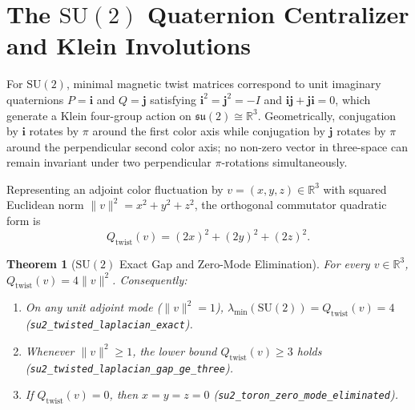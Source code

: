 \documentclass[11pt,a4paper]{article}
\newtheorem{theorem}{Theorem}[section]
\newcommand{\R}{\mathbb{R}}
\newcommand{\SU}{\mathrm{SU}}
\begin{document}
\section{The $\SU(2)$ Quaternion Centralizer and Klein Involutions}
For $\SU(2)$, minimal magnetic twist matrices correspond to unit imaginary quaternions $P = \mathbf{i}$ and $Q = \mathbf{j}$ satisfying $\mathbf{i}^2 = \mathbf{j}^2 = -I$ and $\mathbf{i}\mathbf{j} + \mathbf{j}\mathbf{i} = 0$, which generate a Klein four-group action on $\mathfrak{su}(2) \cong \R^3$. Geometrically, conjugation by $\mathbf{i}$ rotates by $\pi$ around the first color axis while conjugation by $\mathbf{j}$ rotates by $\pi$ around the perpendicular second color axis; no non-zero vector in three-space can remain invariant under two perpendicular $\pi$-rotations simultaneously.

Representing an adjoint color fluctuation by $v = (x, y, z) \in \R^3$ with squared Euclidean norm $\|v\|^2 = x^2 + y^2 + z^2$, the orthogonal commutator quadratic form is
\begin{equation}
Q_{\mathrm{twist}}(v) = (2x)^2 + (2y)^2 + (2z)^2.
\end{equation}

\begin{theorem}[$\SU(2)$ Exact Gap and Zero-Mode Elimination]
For every $v \in \R^3$, $Q_{\mathrm{twist}}(v) = 4 \|v\|^2$. Consequently:
\begin{enumerate}
\item On any unit adjoint mode ($\|v\|^2 = 1$), $\lambda_{\min}(\SU(2)) = Q_{\mathrm{twist}}(v) = 4$ (\texttt{su2\_\-twisted\_\-laplacian\_\-exact}).
\item Whenever $\|v\|^2 \ge 1$, the lower bound $Q_{\mathrm{twist}}(v) \ge 3$ holds (\texttt{su2\_\-twisted\_\-laplacian\_\-gap\_\-ge\_\-three}).
\item If $Q_{\mathrm{twist}}(v) = 0$, then $x = y = z = 0$ (\texttt{su2\_\-toron\_\-zero\_\-mode\_\-eliminated}).
\end{enumerate}
\end{theorem}
\end{document}
